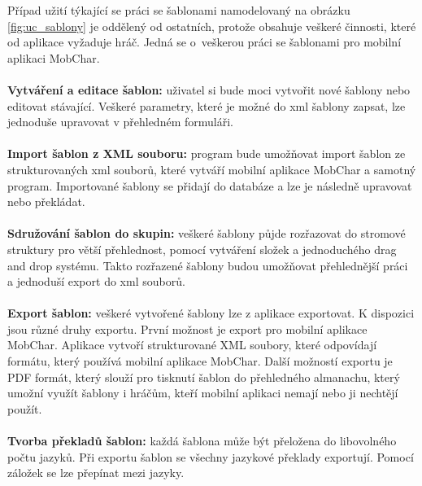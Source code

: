 \documentclass[thesis=B,czech]{resources/FITthesis}[2012/06/26]
\begin{document}
Případ užití týkající se práci se šablonami namodelovaný na obrázku \ref{fig:uc_sablony} je oddělený od ostatních, protože obsahuje veškeré činnosti, které od aplikace vyžaduje hráč. Jedná se o~veškerou práci se šablonami pro mobilní aplikaci MobChar.\\
\\
\textbf{Vytváření a editace šablon:} uživatel si bude moci vytvořit nové šablony nebo editovat stávající. Veškeré parametry, které je možné do xml šablony zapsat, lze jednoduše upravovat v přehledném formuláři.\\
\\
\textbf{Import šablon z XML souboru:} program bude umožňovat import šablon ze strukturovaných xml souborů, které vytváří mobilní aplikace MobChar a samotný program. Importované šablony se přidají do databáze a lze je následně upravovat nebo překládat. \\
\\
\textbf{Sdružování šablon do skupin:} veškeré šablony půjde rozřazovat do stromové struktury pro větší přehlednost, pomocí vytváření složek a jednoduchého drag and drop systému. Takto rozřazené šablony budou umožňovat přehlednější práci a jednoduší export do xml souborů.\\
\\
\textbf{Export šablon:} veškeré vytvořené šablony lze z aplikace exportovat. K dispozici jsou různé druhy exportu. První možnost je export pro mobilní aplikace MobChar. Aplikace vytvoří strukturované XML soubory, které odpovídají formátu, který používá mobilní aplikace MobChar. Další možností exportu je PDF formát, který slouží pro tisknutí šablon do přehledného almanachu, který umožní využít šablony i hráčům, kteří mobilní aplikaci nemají nebo ji nechtějí použít. \\
\\
\textbf{Tvorba překladů šablon:} každá šablona může být přeložena do libovolného počtu jazyků. Při exportu šablon se všechny jazykové překlady exportují. Pomocí záložek se lze přepínat mezi jazyky.\\
\\
\end{document}
